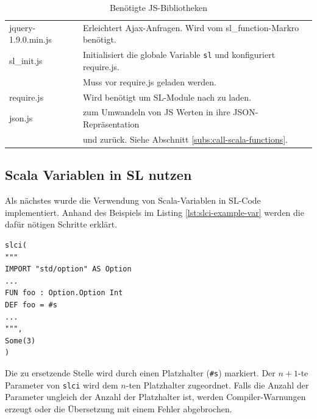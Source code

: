 \documentclass[12pt,bibtotoc]{scrreprt}
\begin{document}
\begin{table}[h]
\caption{Benötigte \ac{JS}-Bibliotheken}
\centering
\begin{tabular}{ll}
jquery-1.9.0.min.js & Erleichtert Ajax-Anfragen. Wird vom sl\_function-Markro benötigt\cite{JQuery1}.\\
sl\_init.js         & Initialisiert die globale Variable \lstinline!sl! und konfiguriert require.js. \\
                    & Muss vor require.js geladen werden.\\
require.js          & Wird benötigt um \ac{SL}-Module nach zu laden\cite{RequireJS1}.\\
json.js             & zum Umwandeln von JS Werten in ihre JSON-Repräsentation \\
                    & und zurück. Siehe Abschnitt \ref{subs:call-scala-functions}\cite{Crockford2010}.\\
\end{tabular}
\label{tab:js-libraries}
\end{table}

\subsection{Scala Variablen in SL nutzen}

Als nächstes wurde die Verwendung von Scala-Variablen in \ac{SL}-Code implementiert. Anhand des Beispiels im Listing \ref{lst:slci-example-var} werden die dafür nötigen Schritte erklärt.

\begin{lstlisting}[caption={Beispielaufruf des slci Macros mit Scala Variablen}, label=lst:slci-example-var, float=h]
slci(
"""
IMPORT "std/option" AS Option 
...
FUN foo : Option.Option Int
DEF foo = #s
...
""",
Some(3)
)
\end{lstlisting}

Die zu ersetzende Stelle wird durch einen Platzhalter (\lstinline!#s!) markiert. Der $n+1$-te Parameter von \lstinline!slci! wird dem $n$-ten Platzhalter zugeordnet. Falls die Anzahl der Parameter ungleich der Anzahl der Platzhalter ist, werden Compiler-Warnungen erzeugt oder die Übersetzung mit einem Fehler abgebrochen. 
\end{document}
